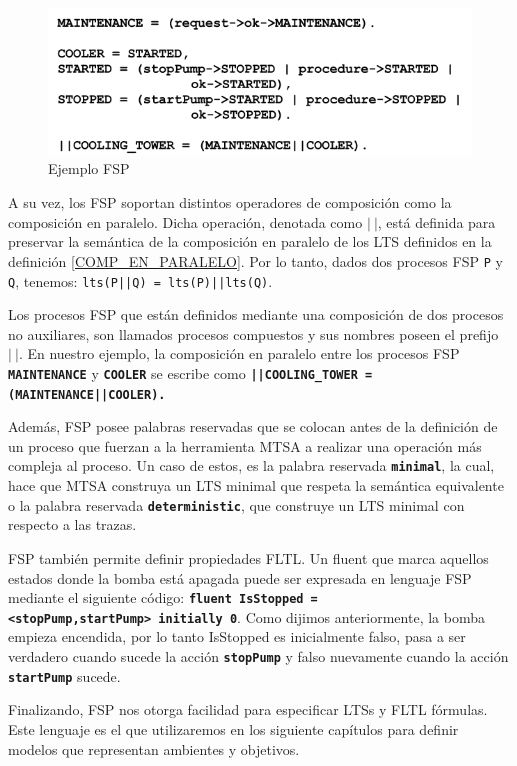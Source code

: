\begin{figure}
    \centering
    \includegraphics[scale=0.50]{img/FSP.png}
    \caption{Ejemplo FSP}
    \label{FSP}
\end{figure}

A su vez, los FSP soportan distintos operadores de composición como la composición en paralelo. Dicha operación,
denotada como $|\ |$, está definida para preservar la semántica de la composición en paralelo de los LTS definidos en la
definición \ref{COMP_EN_PARALELO}. Por lo tanto, dados dos procesos FSP \texttt{P} y \texttt{Q}, tenemos:
\texttt{lts(P||Q) = lts(P)||lts(Q)}.

Los procesos FSP que están definidos mediante una composición de dos procesos no auxiliares, son llamados procesos
compuestos y sus nombres poseen el prefijo $|\ |$. En nuestro ejemplo, la composición en paralelo entre los procesos FSP 
\texttt{\textbf{MAINTENANCE}} y \texttt{\textbf{COOLER}} se escribe como \texttt{\textbf{||COOLING\_TOWER =
(MAINTENANCE||COOLER).}}

Además, FSP posee palabras reservadas que se colocan antes de la definición de un proceso que fuerzan a la herramienta
MTSA a realizar una operación más compleja al proceso. Un caso de estos, es la palabra reservada
\texttt{\textbf{minimal}}, la cual, hace que MTSA construya un LTS minimal que respeta la semántica equivalente o la
palabra reservada \texttt{\textbf{deterministic}}, que construye un LTS minimal con respecto a las trazas.

FSP también permite definir propiedades FLTL. Un fluent que marca aquellos estados donde la bomba está apagada puede ser
expresada en lenguaje FSP mediante el siguiente código: \texttt{\textbf{fluent IsStopped = <stopPump,startPump>\ initially 0}}.
Como dijimos anteriormente, la bomba empieza encendida, por lo tanto IsStopped es inicialmente falso, pasa a ser
verdadero cuando sucede la acción \texttt{\textbf{stopPump}} y falso nuevamente cuando la acción \texttt{\textbf{startPump}} sucede.

Finalizando, FSP nos otorga facilidad para especificar LTSs y FLTL fórmulas. Este lenguaje es el que utilizaremos en los
siguiente capítulos para definir modelos que representan ambientes y objetivos. 
